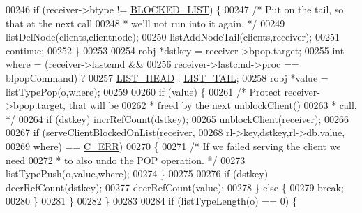 \begin{DoxyCode}
00246                         \textcolor{keywordflow}{if} (receiver->btype != \hyperlink{server_8h_a279f6a31729ba24d6dab0944b82e0b55}{BLOCKED\_LIST}) \{
00247                             \textcolor{comment}{/* Put on the tail, so that at the next call}
00248 \textcolor{comment}{                             * we'll not run into it again. */}
00249                             listDelNode(clients,clientnode);
00250                             listAddNodeTail(clients,receiver);
00251                             \textcolor{keywordflow}{continue};
00252                         \}
00253 
00254                         robj *dstkey = receiver->bpop.target;
00255                         \textcolor{keywordtype}{int} where = (receiver->lastcmd &&
00256                                      receiver->lastcmd->proc == blpopCommand) ?
00257                                     \hyperlink{server_8h_a5fc6a15ca26c6208f66ad2768a3108ef}{LIST\_HEAD} : \hyperlink{server_8h_a745de98bef5b645df56479181803235b}{LIST\_TAIL};
00258                         robj *value = listTypePop(o,where);
00259 
00260                         \textcolor{keywordflow}{if} (value) \{
00261                             \textcolor{comment}{/* Protect receiver->bpop.target, that will be}
00262 \textcolor{comment}{                             * freed by the next unblockClient()}
00263 \textcolor{comment}{                             * call. */}
00264                             \textcolor{keywordflow}{if} (dstkey) incrRefCount(dstkey);
00265                             unblockClient(receiver);
00266 
00267                             \textcolor{keywordflow}{if} (serveClientBlockedOnList(receiver,
00268                                 rl->key,dstkey,rl->db,value,
00269                                 where) == \hyperlink{server_8h_af98ac28d5f4d23d7ed5985188e6fb7d1}{C\_ERR})
00270                             \{
00271                                 \textcolor{comment}{/* If we failed serving the client we need}
00272 \textcolor{comment}{                                 * to also undo the POP operation. */}
00273                                     listTypePush(o,value,where);
00274                             \}
00275 
00276                             \textcolor{keywordflow}{if} (dstkey) decrRefCount(dstkey);
00277                             decrRefCount(value);
00278                         \} \textcolor{keywordflow}{else} \{
00279                             \textcolor{keywordflow}{break};
00280                         \}
00281                     \}
00282                 \}
00283 
00284                 \textcolor{keywordflow}{if} (listTypeLength(o) == 0) \{

\end{DoxyCode}
